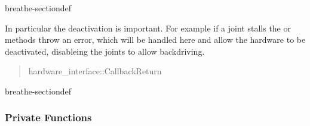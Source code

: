 \documentclass[letterpaper,10pt,english]{sphinxmanual}
\begin{document}
\begin{fulllineitems}
\begin{sphinxuseclass}{breathe-sectiondef}
\begin{fulllineitems}
In particular the deactivation is important. For example if a joint stalls the {\hyperref[\detokenize{code/bioscara_hardware_interfaces/index:classbioscara__hardware__interfaces_1_1BioscaraArmHardwareInterface_1adc34f1df847375abf18fe8100ecec1d1}]{}} or {\hyperref[\detokenize{code/bioscara_hardware_interfaces/index:classbioscara__hardware__interfaces_1_1BioscaraArmHardwareInterface_1a4ffd7d4e6890f9dfc3d757fb5e3bd5e3}]{}} methods throw an error, which will be handled here and allow the hardware to be deactivated, disableing the joints to allow backdriving.
\begin{quote}\begin{description}
\sphinxAtStartPar
{} \textendash{} 

\sphinxAtStartPar
hardware\_interface::CallbackReturn 

\end{description}\end{quote}

\end{fulllineitems}


\end{sphinxuseclass}
\begin{sphinxuseclass}{breathe-sectiondef}\subsubsection*{Private Functions}


\end{sphinxuseclass}
\end{fulllineitems}
\end{document}
